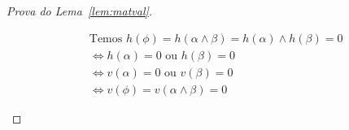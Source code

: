 \begin{proof}[Prova do Lema~\ref{lem:matval}]
\begin{provaporcasos}
\begin{provaporsubcasos}
                \begin{align*}
                    &\text{Temos } h(\phi) = h(\alpha \land \beta) = h(\alpha) \land h(\beta) = 0\\
                    &\Longleftrightarrow h(\alpha) = 0\text{ ou }h(\beta) = 0\tag*{(Matriz de $\land$)}\\
                    &\Longleftrightarrow v(\alpha) = 0\text{ ou }v(\beta) = 0 \tag*{(HI)}\\
                    &\Longleftrightarrow v(\phi) = v(\alpha \land \beta) = 0\tag*{$(vAnd)$}
                \end{align*}

            \end{provaporsubcasos}



\end{provaporcasos}
\end{proof}
